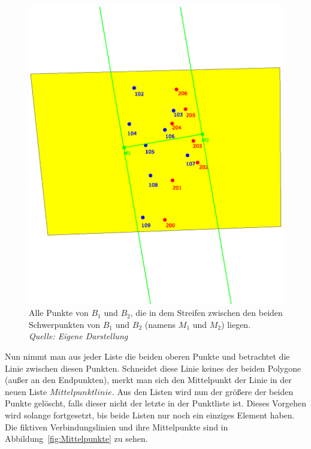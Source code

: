\begin{figure}
	\centering
	\includegraphics[scale=0.5]{RectDist.eps}
	\caption[Punkte mit einem rechtwinkeligen Abstand zur Schwerpunktlinie]{Alle Punkte von $B_1$ und $B_2$, die in dem Streifen zwischen den beiden Schwerpunkten von $B_1$ und $B_2$ (namens $M_1$ und $M_2$) liegen.\\\textit{Quelle: Eigene Darstellung}}
	\label{fig:RectDist}		
\end{figure}


Nun nimmt man aus jeder Liste die beiden oberen Punkte und betrachtet die Linie zwischen diesen Punkten. Schneidet diese Linie keines der beiden Polygone (außer an den Endpunkten), merkt man sich den Mittelpunkt der Linie in der neuen Liste  $Mittelpunktlinie$. Aus den Listen wird nun der größere der beiden Punkte gelöscht, falls dieser nicht der letzte in der Punktliste ist. Dieses Vorgehen wird solange fortgesetzt, bis beide Listen nur noch ein einziges Element haben. Die fiktiven Verbindungslinien und ihre Mittelpunkte sind in Abbildung~\vref{fig:Mittelpunkte} zu sehen.

